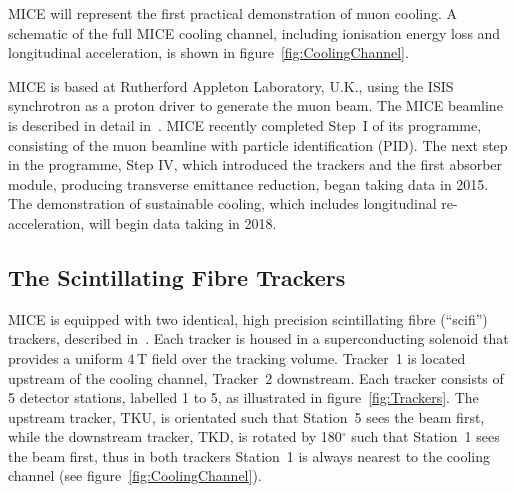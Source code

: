   MICE will represent the first practical demonstration of muon cooling. A schematic of the full MICE cooling channel, including ionisation energy loss and longitudinal acceleration, is shown in figure~\ref{fig:CoolingChannel}.

  MICE is based at Rutherford Appleton Laboratory, U.K., using the ISIS synchrotron as a proton driver to generate the muon beam.  The MICE beamline is described in detail in~\cite{MiceBeamline}.  MICE recently completed Step~I of its programme, consisting of the muon beamline with particle identification (PID). The next step in the programme, Step IV, which introduced the trackers and the first absorber module, producing transverse emittance reduction, began taking data in 2015. The demonstration of sustainable cooling, which includes longitudinal re-acceleration, will begin data taking in 2018.


  \subsection{The Scintillating Fibre Trackers}
  \label{subsec:Trackers}
  MICE is equipped with two identical, high precision scintillating fibre (``scifi'') trackers, described in~\cite{MiceTrackers}. Each tracker is housed in a superconducting solenoid that provides a uniform 4\,T field over the tracking volume. Tracker~1 is located upstream of the cooling channel, Tracker~2 downstream.  Each tracker consists of 5 detector stations, labelled 1 to 5, as illustrated in figure~\ref{fig:Trackers}. The upstream tracker, TKU, is orientated such that Station~5 sees the beam first, while the downstream tracker, TKD, is rotated by 180$^\circ$ such that Station~1 sees the beam first, thus in both trackers Station~1 is always nearest to the cooling channel (see figure~\ref{fig:CoolingChannel}).
  
